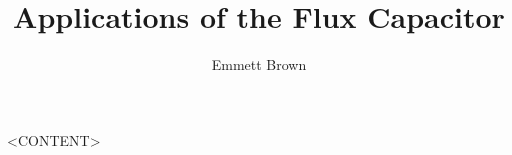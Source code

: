 \documentclass[11pt]{book}
\title{Applications of the Flux Capacitor}
\author{Emmett Brown}
\begin{document}
\maketitle
\tableofcontents
\newpage

<CONTENT>
\end{document}
